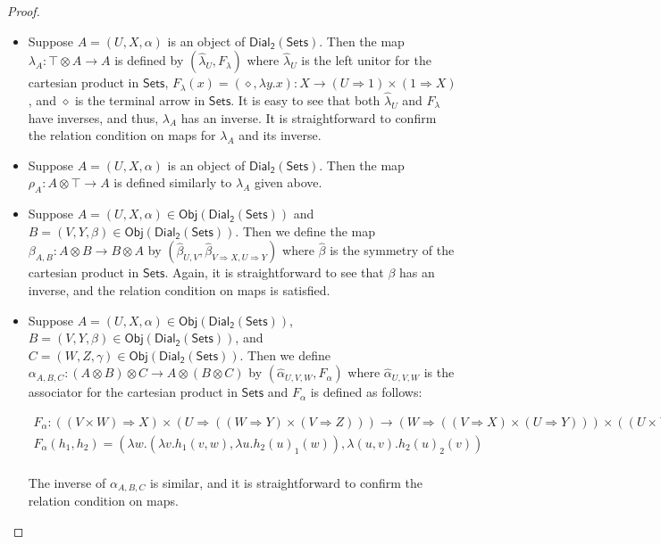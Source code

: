 \documentclass{elsarticle}
\newcommand{\dial}[0]{\mathsf{Dial_2}(\mathsf{Sets})}
\newcommand{\sets}[0]{\mathsf{Sets}}
\newcommand{\obj}[1]{\mathsf{Obj}(#1)}
\begin{document}
\begin{proof}
\begin{report}
\begin{center}
\begin{itemize}
    \item Suppose $A = (U,X,\alpha)$ is an object of $\dial$.  Then
      the map $\lambda_A : \top \otimes A \to A$ is defined by
      $(\hat{\lambda}_U,F_\lambda)$ where
      $\hat{\lambda}_U$ is the left unitor for the cartesian product in $\sets$,
      $F_\lambda(x) = (\diamond,\lambda y.x) : X \to (U \Rightarrow 1) \times (1 \Rightarrow X)$, 
      and $\diamond$ is the terminal arrow in $\sets$.
      It is easy to see that both
      $\hat{\lambda}_U$ and $F_\lambda$ have
      inverses, and thus, $\lambda_A$ has an inverse. It is straightforward to confirm the relation condition on maps
      for $\lambda_A$ and its inverse.

    \item Suppose $A = (U,X,\alpha)$ is an object of $\dial$.  Then
      the map $\rho_A : A \otimes \top \to A$ is defined similarly to
      $\lambda_A$ given above.

    \item Suppose $A = (U,X,\alpha) \in \obj{\dial}$ and
      $B = (V,Y,\beta) \in \obj{\dial}$.  Then we define the map
      $\beta_{A,B} : A \otimes B \to B \otimes A$ by
      $(\hat{\beta}_{U,V}, \hat{\beta}_{V \Rightarrow X,U \Rightarrow
        Y})$
      where $\hat{\beta}$ is the symmetry of the cartesian product in
      $\sets$.  Again, it is straightforward to see that $\beta$ has
      an inverse, and the relation condition on maps is satisfied.

    \item Suppose $A = (U,X,\alpha) \in \obj{\dial}$,
      $B = (V,Y,\beta) \in \obj{\dial}$, and
      $C = (W,Z,\gamma) \in \obj{\dial}$.  Then we define
      $\alpha_{A,B,C} : (A \otimes B) \otimes C \to A \otimes (B \otimes C)$
      by $(\hat{\alpha}_{U,V,W}, F_\alpha)$ where
      $\hat{\alpha}_{U,V,W}$ is the associator for the cartesian
      product in $\sets$ and $F_\alpha$ is defined as follows:
      \begin{center}
        \scriptsize
        \begin{math}
          \begin{array}{lll}
            F_\alpha : ((V \times W) \Rightarrow X) \times (U \Rightarrow ((W \Rightarrow Y) \times (V \Rightarrow Z))) \to 
            (W \Rightarrow ((V \Rightarrow X) \times (U \Rightarrow Y))) \times ((U \times V) \Rightarrow Z)\\
            F_\alpha(h_1,h_2) = (\lambda w.(\lambda v.h_1(v,w),\lambda u.h_2(u)_1(w)), \lambda (u,v).h_2(u)_2(v))\\
          \end{array}
        \end{math}
      \end{center}
      The inverse of $\alpha_{A,B,C}$ is similar, and it is
      straightforward to confirm the relation condition on maps.


\end{itemize}
\end{center}
\end{report}
\end{proof}
\end{document}
